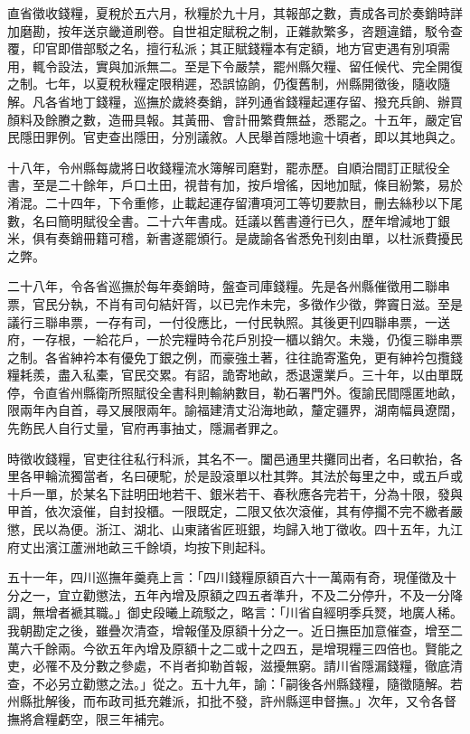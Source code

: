 \begin{pinyinscope}
直省徵收錢糧，夏稅於五六月，秋糧於九十月，其報部之數，責成各司於奏銷時詳加磨勘，按年送京畿道刷卷。自世祖定賦稅之制，正雜款繁多，咨題違錯，駁令查覆，印官即借部駁之名，擅行私派；其正賦錢糧本有定額，地方官吏遇有別項需用，輒令設法，實與加派無二。至是下令嚴禁，罷州縣欠糧、留任候代、完全開復之制。七年，以夏稅秋糧定限稍遲，恐誤協餉，仍復舊制，州縣開徵後，隨收隨解。凡各省地丁錢糧，巡撫於歲終奏銷，詳列通省錢糧起運存留、撥充兵餉、辦買顏料及餘賸之數，造冊具報。其黃冊、會計冊繁費無益，悉罷之。十五年，嚴定官民隱田罪例。官吏查出隱田，分別議敘。人民舉首隱地逾十頃者，即以其地與之。

十八年，令州縣每歲將日收錢糧流水簿解司磨對，罷赤歷。自順治間訂正賦役全書，至是二十餘年，戶口土田，視昔有加，按戶增徭，因地加賦，條目紛繁，易於淆混。二十四年，下令重修，止載起運存留漕項河工等切要款目，刪去絲秒以下尾數，名曰簡明賦役全書。二十六年書成。廷議以舊書遵行已久，歷年增減地丁銀米，俱有奏銷冊籍可稽，新書遂罷頒行。是歲諭各省悉免刊刻由單，以杜派費擾民之弊。

二十八年，令各省巡撫於每年奏銷時，盤查司庫錢糧。先是各州縣催徵用二聯串票，官民分執，不肖有司句結奸胥，以已完作未完，多徵作少徵，弊竇日滋。至是議行三聯串票，一存有司，一付役應比，一付民執照。其後更刊四聯串票，一送府，一存根，一給花戶，一於完糧時令花戶別投一櫃以銷欠。未幾，仍復三聯串票之制。各省紳衿本有優免丁銀之例，而豪強土著，往往詭寄濫免，更有紳衿包攬錢糧耗羨，盡入私橐，官民交累。有詔，詭寄地畝，悉退還業戶。三十年，以由單既停，令直省州縣衛所照賦役全書科則輸納數目，勒石署門外。復諭民間隱匿地畝，限兩年內自首，尋又展限兩年。諭福建清丈沿海地畝，釐定疆界，湖南幅員遼闊，先飭民人自行丈量，官府再事抽丈，隱漏者罪之。

時徵收錢糧，官吏往往私行科派，其名不一。闔邑通里共攤同出者，名曰軟抬，各里各甲輪流獨當者，名曰硬駝，於是設滾單以杜其弊。其法於每里之中，或五戶或十戶一單，於某名下註明田地若干、銀米若干、春秋應各完若干，分為十限，發與甲首，依次滾催，自封投櫃。一限既定，二限又依次滾催，其有停擱不完不繳者嚴懲，民以為便。浙江、湖北、山東諸省匠班銀，均歸入地丁徵收。四十五年，九江府丈出濱江蘆洲地畝三千餘頃，均按下則起科。

五十一年，四川巡撫年羹堯上言：「四川錢糧原額百六十一萬兩有奇，現僅徵及十分之一，宜立勸懲法，五年內增及原額之四五者準升，不及二分停升，不及一分降調，無增者褫其職。」御史段曦上疏駁之，略言：「川省自經明季兵燹，地廣人稀。我朝勘定之後，雖疊次清查，增報僅及原額十分之一。近日撫臣加意催查，增至二萬六千餘兩。今欲五年內增及原額十之二或十之四五，是增現糧三四倍也。賢能之吏，必罹不及分數之參處，不肖者抑勒首報，滋擾無窮。請川省隱漏錢糧，徹底清查，不必另立勸懲之法。」從之。五十九年，諭：「嗣後各州縣錢糧，隨徵隨解。若州縣批解後，而布政司抵充雜派，扣批不發，許州縣逕申督撫。」次年，又令各督撫將倉糧虧空，限三年補完。


\end{pinyinscope}
